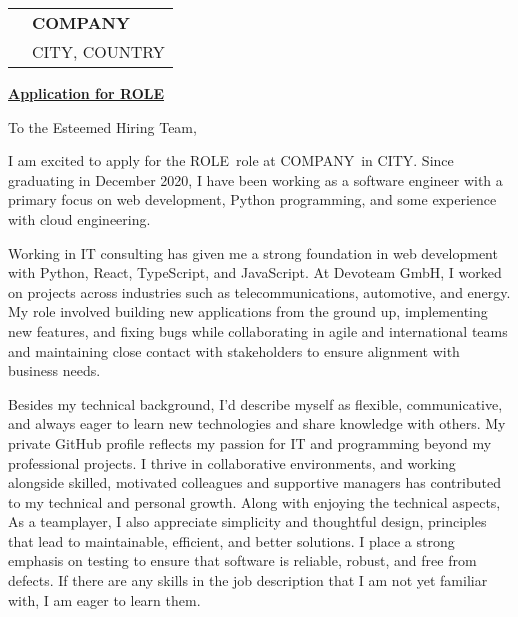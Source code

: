 \documentclass[10pt, a4paper]{article}
\begin{document}
\vspace{2.5cm}
\bigskip
\bigskip


\newcommand{\COMPANY}{COMPANY}
\newcommand{\ROLE}{ROLE}
\newcommand{\CITY}{CITY}
\newcommand{\COUNTRY}{COUNTRY}

\begin{tabular}{@{}p{0cm}l@{}} 
 & \textbf{\COMPANY} \\[0.8ex] 
 & \CITY, \COUNTRY
\end{tabular}

\bigskip %

\hfill {}

\noindent \textbf{\underline{Application for \ROLE}}

To the Esteemed Hiring Team,
\bigskip

I am excited to apply for the \ROLE\ role at \COMPANY\ in \CITY. Since graduating in December 2020, I have been working as a software engineer with a primary focus on web development, Python programming, and some experience with cloud engineering.

Working in IT consulting has given me a strong foundation in web development with Python, React, TypeScript, and JavaScript. At Devoteam GmbH, I worked on projects across industries such as telecommunications, automotive, and energy. My role involved building new applications from the ground up, implementing new features, and fixing bugs while collaborating in agile and international teams and maintaining close contact with stakeholders to ensure alignment with business needs.

Besides my technical background, I’d describe myself as flexible, communicative, and always eager to learn new technologies and share knowledge with others. My private GitHub profile reflects my passion for IT and programming beyond my professional projects. I thrive in collaborative environments, and working alongside skilled, motivated colleagues and supportive managers has contributed to my technical and personal growth. Along with enjoying the technical aspects, As a teamplayer, I also appreciate simplicity and thoughtful design, principles that lead to maintainable, efficient, and better solutions. I place a strong emphasis on testing to ensure that software is reliable, robust, and free from defects. If there are any skills in the job description that I am not yet familiar with, I am eager to learn them.
\end{document}
